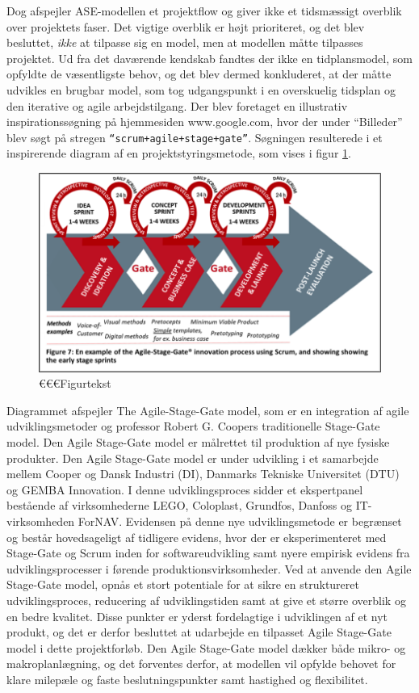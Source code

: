 	 Dog afspejler ASE-modellen et projektflow og giver ikke et tidsmæssigt overblik over projektets faser. Det vigtige overblik er højt prioriteret, og det blev besluttet, \textit{ikke} at tilpasse sig en model, men at modellen måtte tilpasses projektet. Ud fra det daværende kendskab fandtes der ikke en tidplansmodel, som opfyldte de væsentligste behov, og det blev dermed konkluderet, at der måtte udvikles en brugbar model, som tog udgangspunkt i en overskuelig tidsplan og den iterative og agile arbejdstilgang. Der blev foretaget en illustrativ inspirationssøgning på hjemmesiden www.google.com, hvor der under “Billeder” blev søgt på stregen \texttt{“scrum+agile+stage+gate”}. Søgningen resulterede i et inspirerende diagram af en projektstyringsmetode, som vises i figur \ref{fig:inspidia}.  
	
	\begin{figure}[htb]
		\centering
		\includegraphics[width=5in]{inspirerendediagram}
		\caption{€€€Figurtekst}
		\label{fig:inspidia}	
	\end{figure}

	Diagrammet afspejler The Agile-Stage-Gate model, som er en integration af agile udviklingsmetoder og professor Robert G. Coopers traditionelle Stage-Gate model. Den Agile Stage-Gate model er målrettet til produktion af nye fysiske produkter. Den Agile Stage-Gate model er under udvikling i et samarbejde mellem Cooper og Dansk Industri (DI), Danmarks Tekniske Universitet (DTU) og GEMBA Innovation. I denne udviklingsproces sidder et ekspertpanel bestående af virksomhederne LEGO, Coloplast, Grundfos, Danfoss og IT-virksomheden ForNAV. Evidensen på denne nye udviklingsmetode er begrænset og består hovedsageligt af tidligere evidens, hvor der er eksperimenteret med Stage-Gate og Scrum inden for softwareudvikling samt nyere empirisk evidens fra udviklingsprocesser i førende produktionsvirksomheder. Ved at anvende den Agile Stage-Gate model, opnås et stort potentiale for at sikre en struktureret udviklingsproces, reducering af udviklingstiden samt at give et større overblik og en bedre kvalitet. Disse punkter er yderst fordelagtige i udviklingen af et nyt produkt, og det er derfor besluttet at udarbejde en tilpasset Agile Stage-Gate model i dette projektforløb. Den Agile Stage-Gate model dækker både mikro- og makroplanlægning, og det forventes derfor, at modellen vil opfylde behovet for klare milepæle og faste beslutningspunkter samt hastighed og flexibilitet. 
	   
